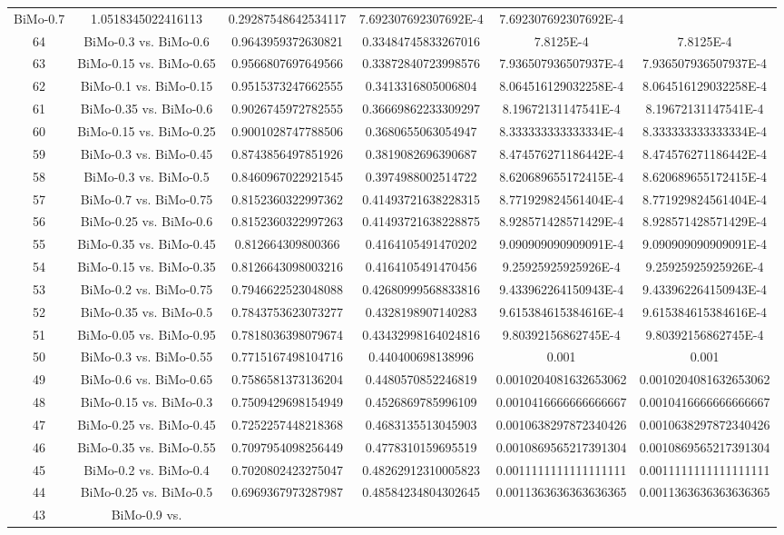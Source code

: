 \documentclass[a4paper,10pt]{article}
\begin{document}
\begin{landscape}
\begin{table}[!htp]
\begin{tabular}{cccccc}
BiMo-0.7&1.0518345022416113&0.29287548642534117&7.692307692307692E-4&7.692307692307692E-4\\64&BiMo-0.3 vs. BiMo-0.6&0.9643959372630821&0.33484745833267016&7.8125E-4&7.8125E-4\\63&BiMo-0.15 vs. BiMo-0.65&0.9566807697649566&0.33872840723998576&7.936507936507937E-4&7.936507936507937E-4\\62&BiMo-0.1 vs. BiMo-0.15&0.9515373247662555&0.3413316805006804&8.064516129032258E-4&8.064516129032258E-4\\61&BiMo-0.35 vs. BiMo-0.6&0.9026745972782555&0.36669862233309297&8.19672131147541E-4&8.19672131147541E-4\\60&BiMo-0.15 vs. BiMo-0.25&0.9001028747788506&0.3680655063054947&8.333333333333334E-4&8.333333333333334E-4\\59&BiMo-0.3 vs. BiMo-0.45&0.8743856497851926&0.3819082696390687&8.474576271186442E-4&8.474576271186442E-4\\58&BiMo-0.3 vs. BiMo-0.5&0.8460967022921545&0.3974988002514722&8.620689655172415E-4&8.620689655172415E-4\\57&BiMo-0.7 vs. BiMo-0.75&0.8152360322997362&0.41493721638228315&8.771929824561404E-4&8.771929824561404E-4\\56&BiMo-0.25 vs. BiMo-0.6&0.8152360322997263&0.41493721638228875&8.928571428571429E-4&8.928571428571429E-4\\55&BiMo-0.35 vs. BiMo-0.45&0.812664309800366&0.4164105491470202&9.090909090909091E-4&9.090909090909091E-4\\54&BiMo-0.15 vs. BiMo-0.35&0.8126643098003216&0.4164105491470456&9.25925925925926E-4&9.25925925925926E-4\\53&BiMo-0.2 vs. BiMo-0.75&0.7946622523048088&0.42680999568833816&9.433962264150943E-4&9.433962264150943E-4\\52&BiMo-0.35 vs. BiMo-0.5&0.7843753623073277&0.4328198907140283&9.615384615384616E-4&9.615384615384616E-4\\51&BiMo-0.05 vs. BiMo-0.95&0.7818036398079674&0.43432998164024816&9.80392156862745E-4&9.80392156862745E-4\\50&BiMo-0.3 vs. BiMo-0.55&0.7715167498104716&0.440400698138996&0.001&0.001\\49&BiMo-0.6 vs. BiMo-0.65&0.7586581373136204&0.4480570852246819&0.0010204081632653062&0.0010204081632653062\\48&BiMo-0.15 vs. BiMo-0.3&0.7509429698154949&0.4526869785996109&0.0010416666666666667&0.0010416666666666667\\47&BiMo-0.25 vs. BiMo-0.45&0.7252257448218368&0.4683135513045903&0.0010638297872340426&0.0010638297872340426\\46&BiMo-0.35 vs. BiMo-0.55&0.7097954098256449&0.4778310159695519&0.0010869565217391304&0.0010869565217391304\\45&BiMo-0.2 vs. BiMo-0.4&0.7020802423275047&0.48262912310005823&0.0011111111111111111&0.0011111111111111111\\44&BiMo-0.25 vs. BiMo-0.5&0.6969367973287987&0.48584234804302645&0.0011363636363636365&0.0011363636363636365\\43&BiMo-0.9 vs. 
\end{tabular}
\end{table}
\end{landscape}
\end{document}
